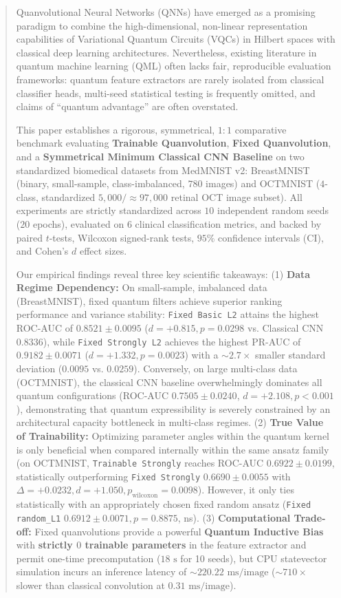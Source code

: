 \documentclass[journal]{IEEEtran}
\begin{document}
\begin{abstract}
Quanvolutional Neural Networks (QNNs) have emerged as a promising paradigm to combine the high-dimensional, non-linear representation capabilities of Variational Quantum Circuits (VQCs) in Hilbert spaces with classical deep learning architectures. Nevertheless, existing literature in quantum machine learning (QML) often lacks fair, reproducible evaluation frameworks: quantum feature extractors are rarely isolated from classical classifier heads, multi-seed statistical testing is frequently omitted, and claims of ``quantum advantage'' are often overstated. 

This paper establishes a rigorous, symmetrical, $1:1$ comparative benchmark evaluating \textbf{Trainable Quanvolution}, \textbf{Fixed Quanvolution}, and a \textbf{Symmetrical Minimum Classical CNN Baseline} on two standardized biomedical datasets from MedMNIST v2: BreastMNIST (binary, small-sample, class-imbalanced, $780$ images) and OCTMNIST ($4$-class, standardized $5{,}000 / \approx 97{,}000$ retinal OCT image subset). All experiments are strictly standardized across $10$ independent random seeds ($20$ epochs), evaluated on $6$ clinical classification metrics, and backed by paired $t$-tests, Wilcoxon signed-rank tests, $95\%$ confidence intervals (CI), and Cohen's $d$ effect sizes.

Our empirical findings reveal three key scientific takeaways:
(1) \textbf{Data Regime Dependency:} On small-sample, imbalanced data (BreastMNIST), fixed quantum filters achieve superior ranking performance and variance stability: \texttt{Fixed Basic L2} attains the highest ROC-AUC of $\mathbf{0.8521 \pm 0.0095}$ ($d = +0.815, p = 0.0298$ vs. Classical CNN $0.8336$), while \texttt{Fixed Strongly L2} achieves the highest PR-AUC of $\mathbf{0.9182 \pm 0.0071}$ ($d = +1.332, p = 0.0023$) with a $\sim 2.7\times$ smaller standard deviation ($0.0095$ vs. $0.0259$). Conversely, on large multi-class data (OCTMNIST), the classical CNN baseline overwhelmingly dominates all quantum configurations (ROC-AUC $\mathbf{0.7505 \pm 0.0240}$, $d = +2.108, p < 0.001$), demonstrating that quantum expressibility is severely constrained by an architectural capacity bottleneck in multi-class regimes.
(2) \textbf{True Value of Trainability:} Optimizing parameter angles within the quantum kernel is only beneficial when compared internally within the same ansatz family (on OCTMNIST, \texttt{Trainable Strongly} reaches ROC-AUC $0.6922 \pm 0.0199$, statistically outperforming \texttt{Fixed Strongly} $0.6690 \pm 0.0055$ with $\Delta = +0.0232, d = +1.050, p_{\text{wilcoxon}} = 0.0098$). However, it only ties statistically with an appropriately chosen fixed random ansatz (\texttt{Fixed random\_L1} $0.6912 \pm 0.0071, p = 0.8875$, ns).
(3) \textbf{Computational Trade-off:} Fixed quanvolutions provide a powerful \textbf{Quantum Inductive Bias} with \textbf{strictly $0$ trainable parameters} in the feature extractor and permit one-time precomputation ($18\text{ s}$ for 10 seeds), but CPU statevector simulation incurs an inference latency of $\sim 220.22\text{ ms/image}$ ($\sim 710\times$ slower than classical convolution at $0.31\text{ ms/image}$).


\end{abstract}
\end{document}
